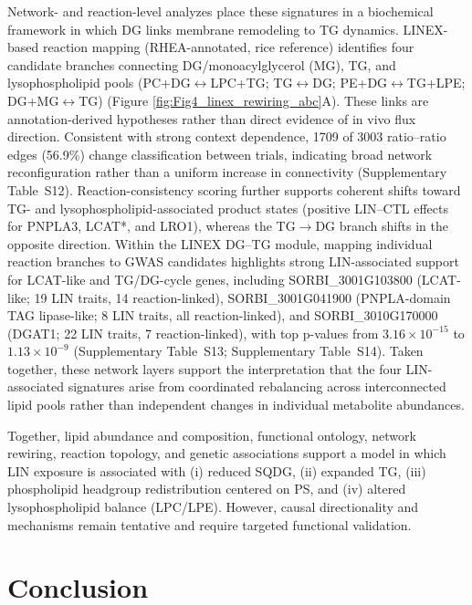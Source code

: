 \documentclass[9pt,twocolumn,twoside]{rilabRxiv}
\begin{document}
Network- and reaction-level analyzes place these signatures in a biochemical framework in which DG links membrane remodeling to TG dynamics. LINEX-based reaction mapping (RHEA-annotated, rice reference) identifies four candidate branches connecting DG/monoacylglycerol (MG), TG, and lysophospholipid pools (PC+DG$\leftrightarrow$LPC+TG; TG$\leftrightarrow$DG; PE+DG$\leftrightarrow$TG+LPE; DG+MG$\leftrightarrow$TG) (Figure \ref{fig:Fig4_linex_rewiring_abc}A). These links are annotation-derived hypotheses rather than direct evidence of in vivo flux direction. Consistent with strong context dependence, 1709 of 3003 ratio--ratio edges (56.9\%) change classification between trials, indicating broad network reconfiguration rather than a uniform increase in connectivity (Supplementary Table~S12). Reaction-consistency scoring further supports coherent shifts toward TG- and lysophospholipid-associated product states (positive LIN--CTL effects for PNPLA3, LCAT*, and LRO1), whereas the TG$\rightarrow$DG branch shifts in the opposite direction. Within the LINEX DG--TG module, mapping individual reaction branches to GWAS candidates highlights strong LIN-associated support for LCAT-like and TG/DG-cycle genes, including SORBI\_3001G103800 (LCAT-like; 19 LIN traits, 14 reaction-linked), SORBI\_3001G041900 (PNPLA-domain TAG lipase-like; 8 LIN traits, all reaction-linked), and SORBI\_3010G170000 (DGAT1; 22 LIN traits, 7 reaction-linked), with top p-values from $3.16 \times 10^{-15}$ to $1.13 \times 10^{-9}$ (Supplementary Table~S13; Supplementary Table~S14). Taken together, these network layers support the interpretation that the four LIN-associated signatures arise from coordinated rebalancing across interconnected lipid pools rather than independent changes in individual metabolite abundances.

Together, lipid abundance and composition, functional ontology, network rewiring, reaction topology, and genetic associations support a model in which LIN exposure is associated with (i) reduced SQDG, (ii) expanded TG, (iii) phospholipid headgroup redistribution centered on PS, and (iv) altered lysophospholipid balance (LPC/LPE). However, causal directionality and mechanisms remain tentative and require targeted functional validation.


\section*{Conclusion}
\end{document}
